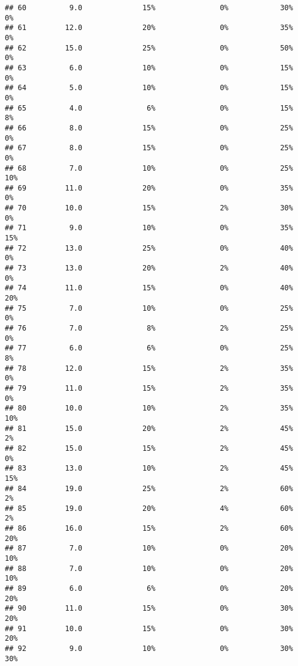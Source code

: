 \documentclass[
]{article}
\begin{document}
\begin{verbatim}
## 60          9.0              15%               0%            30%          0%
## 61         12.0              20%               0%            35%          0%
## 62         15.0              25%               0%            50%          0%
## 63          6.0              10%               0%            15%          0%
## 64          5.0              10%               0%            15%          0%
## 65          4.0               6%               0%            15%          8%
## 66          8.0              15%               0%            25%          0%
## 67          8.0              15%               0%            25%          0%
## 68          7.0              10%               0%            25%         10%
## 69         11.0              20%               0%            35%          0%
## 70         10.0              15%               2%            30%          0%
## 71          9.0              10%               0%            35%         15%
## 72         13.0              25%               0%            40%          0%
## 73         13.0              20%               2%            40%          0%
## 74         11.0              15%               0%            40%         20%
## 75          7.0              10%               0%            25%          0%
## 76          7.0               8%               2%            25%          0%
## 77          6.0               6%               0%            25%          8%
## 78         12.0              15%               2%            35%          0%
## 79         11.0              15%               2%            35%          0%
## 80         10.0              10%               2%            35%         10%
## 81         15.0              20%               2%            45%          2%
## 82         15.0              15%               2%            45%          0%
## 83         13.0              10%               2%            45%         15%
## 84         19.0              25%               2%            60%          2%
## 85         19.0              20%               4%            60%          2%
## 86         16.0              15%               2%            60%         20%
## 87          7.0              10%               0%            20%         10%
## 88          7.0              10%               0%            20%         10%
## 89          6.0               6%               0%            20%         20%
## 90         11.0              15%               0%            30%         20%
## 91         10.0              15%               0%            30%         20%
## 92          9.0              10%               0%            30%         30%

\end{verbatim}
\end{document}

